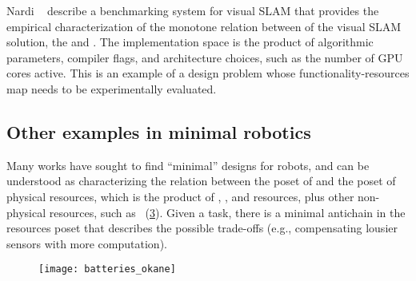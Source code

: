 \begin{figure}[h]
    \begin{center}
    \end{center}
    \caption{\label{fig:progressive-1-1}}
\end{figure}


\begin{example}
    Nardi\,\,\etal~\cite{zia16comparative} describe a benchmarking
    system for visual SLAM that provides the empirical characterization
    of the monotone relation between  of the visual
    SLAM solution, the  and .
    The implementation space is the product
    of algorithmic parameters, compiler flags, and architecture choices,
    such as the number of GPU cores active.
    This is an example of a design
    problem whose functionality-resources map needs to be experimentally
    evaluated.
\end{example}

\begin{figure}[h]
    \centering
    \caption{}
    \label{fig:dp_zia}
\end{figure}

\subsection{Other examples in minimal robotics}

Many works have sought to find ``minimal'' designs for robots, and
can be understood as characterizing the relation between the poset
of  and the poset of physical resources, which is the product
of , , and  resources,
plus other non-physical resources, such as ~(\cref{fig:robot-generic}).
Given a task, there is a minimal antichain in the resources poset
that describes the possible trade-offs (e.g., compensating lousier
sensors with more computation).

\begin{figure}
    \centering
    \texttt{[image: batteries\_okane]}
    \caption{}
    \label{fig:robot-generic}
\end{figure}


